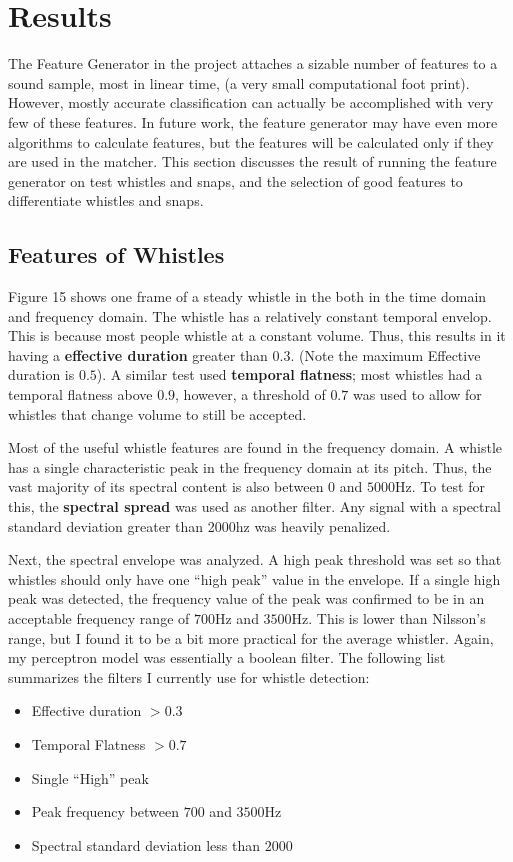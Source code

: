 \documentclass[DIV=calc, paper=a4, fontsize=11pt, twocolumn]{scrartcl}   %
\begin{document}
\section{Results}
   The Feature Generator in the project attaches a sizable number of features to a sound sample, most in linear time,  (a very small computational foot print). However, mostly accurate classification can actually be accomplished with very few of these features. In future work, the feature generator may have even more algorithms to calculate features, but the features will be calculated only if they are used in the matcher. This section discusses the result of running the feature generator on test whistles and snaps, and the selection of good features to differentiate whistles and snaps.

   \subsection{Features of Whistles}

   Figure 15 shows one frame of a steady whistle in the both in the time domain and frequency domain. The whistle has a relatively constant temporal envelop. This is because most people whistle at a constant volume. Thus, this results in it having a \textbf{effective duration} greater than $0.3$. (Note the maximum Effective duration is $0.5$).  A similar test used \textbf{temporal flatness}; most whistles had a temporal flatness above $0.9$, however, a threshold of $0.7$ was used to allow for whistles that change volume to still be accepted.
   \par Most of the useful whistle features are found in the frequency domain. A whistle has a single characteristic peak in the frequency domain at its pitch. Thus, the vast majority of its spectral content is also between $0$ and $5000$Hz. To test for this, the \textbf{spectral spread} was used as another filter. Any signal with a spectral standard deviation greater than 2000hz was heavily penalized.

   \par Next, the spectral envelope was analyzed. A high peak threshold was set so that whistles should only have one ``high peak'' value in the envelope. If a single high peak was detected, the frequency value of the peak was confirmed to be in an acceptable frequency range of $700$Hz and $3500$Hz. This is lower than Nilsson's range, but I found it to be a bit more practical for the average whistler. Again, my perceptron model was essentially a boolean filter. The following list summarizes the filters I currently use for whistle detection:
    \begin{itemize}
        \item Effective duration $> 0.3$
        \item Temporal Flatness  $>0.7$
        \item Single ``High'' peak
        \item Peak frequency between $700$ and $3500$Hz
        \item Spectral standard deviation less than $2000$
      \end{itemize}
\end{document}
